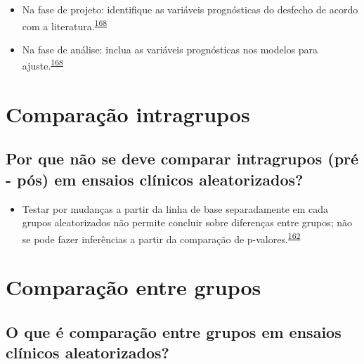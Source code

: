 \documentclass[
  a4paper,
]{book}
\providecommand{\tightlist}{%
  \setlength{\itemsep}{0pt}\setlength{\parskip}{0pt}}
\begin{document}
\begin{itemize}
\item
  Na fase de projeto: identifique as variáveis prognósticas do desfecho de acordo com a literatura.\textsuperscript{\protect\hyperlink{ref-roberts1999}{168}}
\item
  Na fase de análise: inclua as variáveis prognósticas nos modelos para ajuste.\textsuperscript{\protect\hyperlink{ref-roberts1999}{168}}
\end{itemize}

\hypertarget{comparacao-intragrupos}{%
\section{Comparação intragrupos}\label{comparacao-intragrupos}}

\hypertarget{por-que-nuxe3o-se-deve-comparar-intragrupos-pruxe9---puxf3s-em-ensaios-cluxednicos-aleatorizados}{%
\subsection{Por que não se deve comparar intragrupos (pré - pós) em ensaios clínicos aleatorizados?}\label{por-que-nuxe3o-se-deve-comparar-intragrupos-pruxe9---puxf3s-em-ensaios-cluxednicos-aleatorizados}}

\begin{itemize}
\tightlist
\item
  Testar por mudanças a partir da linha de base separadamente em cada grupos aleatorizados não permite concluir sobre diferenças entre grupos; não se pode fazer inferências a partir da comparação de p-valores.\textsuperscript{\protect\hyperlink{ref-bland2011}{162}}
\end{itemize}

\hypertarget{comparacao-entre-grupos}{%
\section{Comparação entre grupos}\label{comparacao-entre-grupos}}

\hypertarget{o-que-uxe9-comparauxe7uxe3o-entre-grupos-em-ensaios-cluxednicos-aleatorizados}{%
\subsection{O que é comparação entre grupos em ensaios clínicos aleatorizados?}\label{o-que-uxe9-comparauxe7uxe3o-entre-grupos-em-ensaios-cluxednicos-aleatorizados}}
\end{document}

